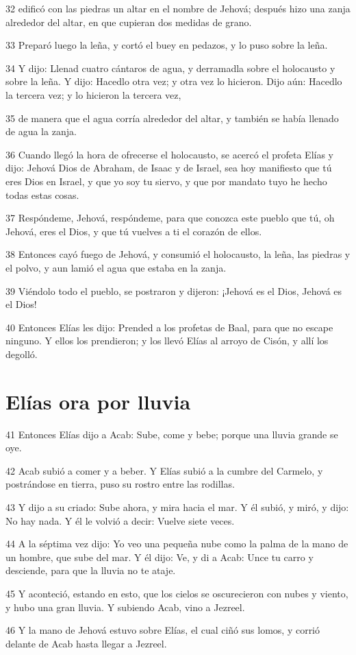 \par 32 edificó con las piedras un altar en el nombre de Jehová; después hizo una zanja alrededor del altar, en que cupieran dos medidas   de grano.
\par 33 Preparó luego la leña, y cortó el buey en pedazos, y lo puso sobre la leña.
\par 34 Y dijo: Llenad cuatro cántaros de agua, y derramadla sobre el holocausto y sobre la leña. Y dijo: Hacedlo otra vez; y otra vez lo hicieron. Dijo aún: Hacedlo la tercera vez; y lo hicieron la tercera vez,
\par 35 de manera que el agua corría alrededor del altar, y también se había llenado de agua la zanja.
\par 36 Cuando llegó la hora de ofrecerse el holocausto, se acercó el profeta Elías y dijo: Jehová Dios de Abraham, de Isaac y de Israel, sea hoy manifiesto que tú eres Dios en Israel, y que yo soy tu siervo, y que por mandato tuyo he hecho todas estas cosas.
\par 37 Respóndeme, Jehová, respóndeme, para que conozca este pueblo que tú, oh Jehová, eres el Dios, y que tú vuelves a ti el corazón de ellos.
\par 38 Entonces cayó fuego de Jehová, y consumió el holocausto, la leña, las piedras y el polvo, y aun lamió el agua que estaba en la zanja.
\par 39 Viéndolo todo el pueblo, se postraron y dijeron: ¡Jehová es el Dios, Jehová es el Dios!
\par 40 Entonces Elías les dijo: Prended a los profetas de Baal, para que no escape ninguno. Y ellos los prendieron; y los llevó Elías al arroyo de Cisón, y allí los degolló.

\section*{Elías ora por lluvia}

\par 41 Entonces Elías dijo a Acab: Sube, come y bebe; porque una lluvia grande se oye.
\par 42 Acab subió a comer y a beber. Y Elías subió a la cumbre del Carmelo, y postrándose en tierra, puso su rostro entre las rodillas.
\par 43 Y dijo a su criado: Sube ahora, y mira hacia el mar. Y él subió, y miró, y dijo: No hay nada. Y él le volvió a decir: Vuelve siete veces.
\par 44 A la séptima vez dijo: Yo veo una pequeña nube como la palma de la mano de un hombre, que sube del mar. Y él dijo: Ve, y di a Acab: Unce tu carro y desciende, para que la lluvia no te ataje.
\par 45 Y aconteció, estando en esto, que los cielos se oscurecieron con nubes y viento, y hubo una gran lluvia. Y subiendo Acab, vino a Jezreel.
\par 46 Y la mano de Jehová estuvo sobre Elías, el cual ciñó sus lomos, y corrió delante de Acab hasta llegar a Jezreel. 

